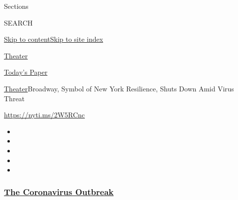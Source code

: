 Sections

SEARCH

\protect\hyperlink{site-content}{Skip to
content}\protect\hyperlink{site-index}{Skip to site index}

\href{https://www.nytimes3xbfgragh.onion/section/theater}{Theater}

\href{https://myaccount.nytimes3xbfgragh.onion/auth/login?response_type=cookie\&client_id=vi}{}

\href{https://www.nytimes3xbfgragh.onion/section/todayspaper}{Today's
Paper}

\href{/section/theater}{Theater}\textbar{}Broadway, Symbol of New York
Resilience, Shuts Down Amid Virus Threat

\url{https://nyti.ms/2W5RCnc}

\begin{itemize}
\item
\item
\item
\item
\item
\end{itemize}

\hypertarget{the-coronavirus-outbreak}{%
\subsubsection{\texorpdfstring{\href{https://www.nytimes3xbfgragh.onion/news-event/coronavirus?name=styln-coronavirus-national\&region=TOP_BANNER\&variant=undefined\&block=storyline_menu_recirc\&action=click\&pgtype=Article\&impression_id=ab7b06d0-e3af-11ea-9f78-853988e69a14}{The
Coronavirus
Outbreak}}{The Coronavirus Outbreak}}\label{the-coronavirus-outbreak}}

